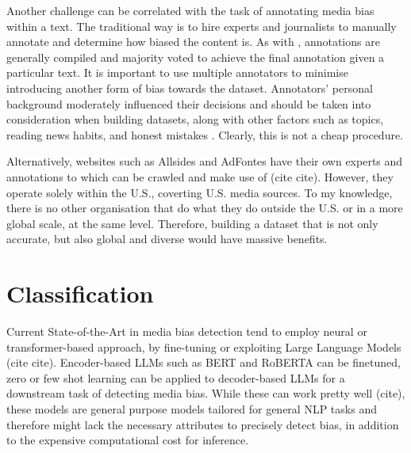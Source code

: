 Another challenge can be correlated with the task of annotating media bias within a text. The traditional way is to hire experts and journalists to manually annotate and determine how biased the content is. As with \cite{spinde-2021-babe}, annotations are generally compiled and majority voted to achieve the final annotation given a particular text. It is important to use multiple annotators to minimise introducing another form of bias towards the dataset. Annotators' personal background moderately influenced their decisions and should be taken into consideration when building datasets, along with other factors such as topics, reading news habits, and honest mistakes \cite{spinde-2021-bias-words}. Clearly, this is not a cheap procedure.

Alternatively, websites such as Allsides and AdFontes have their own experts and annotations to which can be crawled and make use of (cite cite). However, they operate solely within the U.S., coverting U.S. media sources. To my knowledge, there is no other organisation that do what they do outside the U.S. or in a more global scale, at the same level. Therefore, building a dataset that is not only accurate, but also global and diverse would have massive benefits.

\begin{comment}
News Unfold: (NewsUnravel shows that a user-centric approach to media bias data collection can re- turn reliable data while being scalable and evaluated as easy to use. NewsUnravel demonstrates that feedback mechanisms are a promising strategy to reduce data collection expenses and continuously update datasets to changes in context.) (Our approach augments dataset quality by significantly increasing inter-annotator agreement by 26.31\% and improving classifier performance by 2.49\%)
\end{comment}

\section{Classification}

Current State-of-the-Art in media bias detection tend to employ neural or transformer-based approach, by fine-tuning or exploiting Large Language Models (cite cite). Encoder-based LLMs such as BERT and RoBERTA can be finetuned, zero or few shot learning can be applied to decoder-based LLMs for a downstream task of detecting media bias. While these can work pretty well (cite), these models are general purpose models tailored for general NLP tasks and therefore might lack the necessary attributes to precisely detect bias, in addition to the expensive computational cost for inference.

